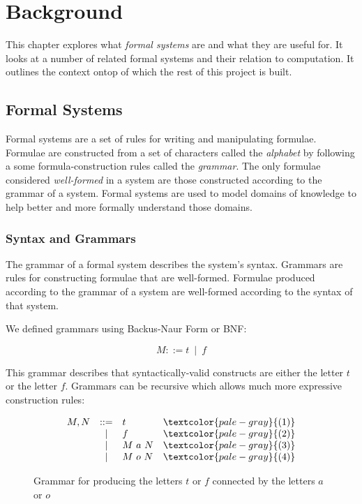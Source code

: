 
\chapter{Background}

This chapter explores what \emph{formal systems} are and what they are useful for. It looks at a number of related formal systems and their relation to computation. It outlines the context ontop of which the rest of this project is built.


\section{Formal Systems}

Formal systems are a set of rules for writing and manipulating
formulae. Formulae are constructed from a set of characters called the
\emph{alphabet} by following a some formula-construction rules called
the \emph{grammar}. The only formulae considered \emph{well-formed} in
a system are those constructed according to the grammar of a system.
Formal systems are used to model domains of knowledge to help better
and more formally understand those domains.

\subsection{Syntax and Grammars}

The grammar of a formal system describes the system's syntax. Grammars are 
rules for constructing formulae that are well-formed. Formulae
produced according to the grammar of a system are well-formed according to 
the syntax of that system.

We defined grammars using Backus-Naur Form or BNF:

\[
  M ::= t\ \mid\ f
\]

This grammar describes that syntactically-valid constructs are either
the letter $t$ or the letter $f$. Grammars can be recursive
which allows much more expressive construction rules:

\begin{figure}[!h]\label{fig:tf-grammar}
\[
  \begin{array}{lclr}
    M,N&::=&t&\textcolor{pale-gray}{(1)} \\
      &|&f&\textcolor{pale-gray}{(2)} \\
      &|&M\ a\ N&\textcolor{pale-gray}{(3)} \\
      &|&M\ o\ N&\textcolor{pale-gray}{(4)}
  \end{array}
\]
\caption{Grammar for producing the letters $t$ or $f$ connected by the letters $a$ or $o$}
\end{figure}

